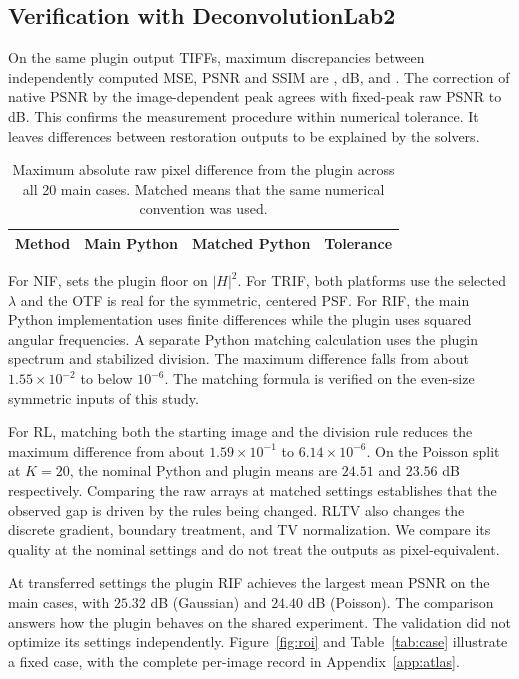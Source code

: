 \subsection{Verification with DeconvolutionLab2}

On the same plugin output TIFFs, maximum discrepancies between independently computed MSE, PSNR and SSIM are \MetricMSEGap, \MetricPSNRGap{} dB, and \MetricSSIMGap{}. The correction of native PSNR by the image-dependent peak agrees with fixed-peak raw PSNR to \NativePSNRGap{} dB. This confirms the measurement procedure within numerical tolerance. It leaves differences between restoration outputs to be explained by the solvers.

\begin{table}[!htbp]
\centering
\caption{Maximum absolute raw pixel difference from the plugin across all 20 main cases. Matched means that the same numerical convention was used.}
\label{tab:parity}
\small
\begin{tabular}{lrrr}
\toprule Method & Main Python & Matched Python & Tolerance\\\midrule

\end{tabular}
\end{table}

For NIF,  sets the plugin floor on \(|H|^2\). For TRIF, both platforms use the selected \(\lambda\) and the OTF is real for the symmetric, centered PSF. For RIF, the main Python implementation uses finite differences while the plugin uses squared angular frequencies. A separate Python matching calculation uses the plugin spectrum and stabilized division. The maximum difference falls from about \(1.55\times10^{-2}\) to below \(10^{-6}\). The matching formula is verified on the even-size symmetric inputs of this study.

For RL, matching both the starting image and the division rule reduces the maximum difference from about \(1.59\times10^{-1}\) to \(6.14\times10^{-6}\). On the Poisson split at \(K=20\), the nominal Python and plugin means are \(24.51\) and \(23.56\) dB respectively. Comparing the raw arrays at matched settings establishes that the observed gap is driven by the rules being changed. RLTV also changes the discrete gradient, boundary treatment, and TV normalization. We compare its quality at the nominal settings and do not treat the outputs as pixel-equivalent.

At transferred settings the plugin RIF achieves the largest mean PSNR on the main cases, with \(25.32\) dB (Gaussian) and \(24.40\) dB (Poisson). The comparison answers how the plugin behaves on the shared experiment. The validation did not optimize its settings independently. Figure~\ref{fig:roi} and Table~\ref{tab:case} illustrate a fixed case, with the complete per-image record in Appendix~\ref{app:atlas}.


